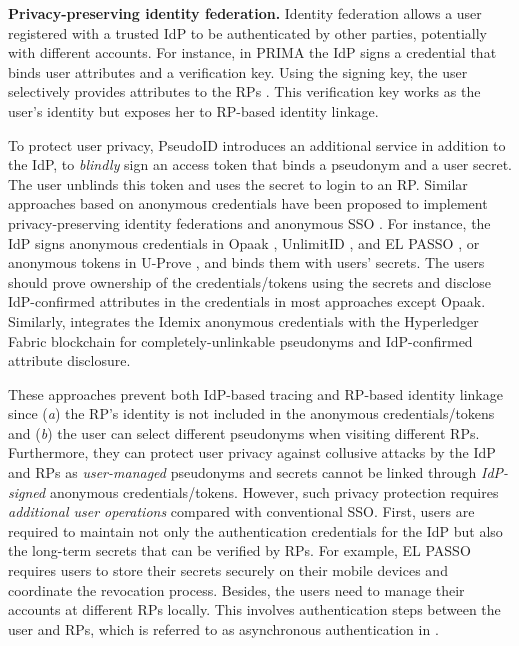 \noindent\textbf{Privacy-preserving identity federation.} Identity federation allows a user registered with a trusted IdP to be authenticated by other parties, potentially with different accounts. For instance, in PRIMA \cite{prima} the IdP signs a credential
that binds user attributes and a verification key. Using the signing key, the user selectively provides attributes to the RPs \cite{Oblivion}.
This verification key works as the user's identity but exposes her to RP-based identity linkage.

To protect user privacy, PseudoID \cite{PseudoID} introduces an additional service in addition to the IdP,
 to \emph{blindly} sign %
an access token that binds a pseudonym and a user secret. The user unblinds this token and uses the secret to login to an RP. Similar approaches based on anonymous credentials \cite{anon-credential-2001, idemix, anon-credential} have been proposed to implement privacy-preserving identity federations \cite{PseudoID, hyperledge-idemix, Opaak, uprov, UnlimitID} and anonymous SSO \cite{ELPASSO}. For instance, the IdP signs anonymous credentials in Opaak \cite{Opaak}, UnlimitID \cite{UnlimitID}, and EL PASSO \cite{ELPASSO}, or anonymous tokens in U-Prove \cite{uprov,uprove-conference}, and binds them with users' secrets. %
The users should prove ownership of the credentials/tokens using the secrets and disclose IdP-confirmed attributes in the credentials in most approaches except Opaak. Similarly, \cite{hyperledge-idemix} integrates the Idemix anonymous credentials \cite{idemix} with the Hyperledger Fabric blockchain for completely-unlinkable pseudonyms and IdP-confirmed attribute disclosure.

These approaches prevent both IdP-based tracing and RP-based identity linkage since (\emph{a}) the RP's identity is not included in the anonymous credentials/tokens and (\emph{b}) the user can select different pseudonyms when visiting different RPs. Furthermore, they can protect user privacy against collusive attacks by the IdP and RPs as \emph{user-managed} pseudonyms and secrets cannot be linked through \emph{IdP-signed} anonymous credentials/tokens.
However, such privacy protection requires \emph{additional user operations} compared with conventional SSO.
First, users are required to maintain not only the authentication credentials for the IdP but also the long-term secrets that can be verified by RPs. For example, EL PASSO \cite{ELPASSO} requires users to store their secrets securely on their mobile devices and coordinate the revocation process. Besides, the users need to manage their accounts at different RPs locally. This involves authentication steps between the user and RPs, which is referred to as asynchronous authentication in \cite{ELPASSO}.

